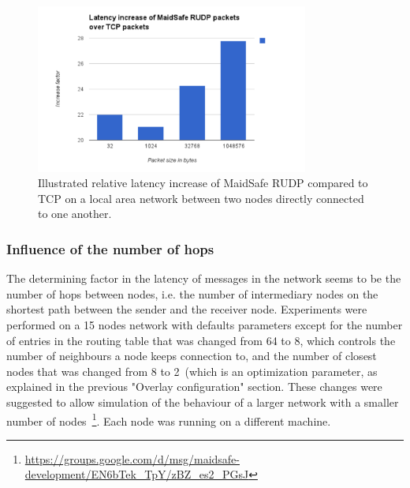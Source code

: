 \begin{figure}[htb]
\begin{center}
\includegraphics[width=0.8\textwidth]{figures/LatencyMaidSafeVsTCP}
\caption[Relative latency increase of MaidSafe RUDP compared to TCP]{\label{fig:LatencyMaidSafeVsTCP} 
Illustrated relative latency increase of MaidSafe RUDP compared to TCP on a local area network between two nodes directly connected to one another.                                                                                                                                                                                                                                                                                                }
\end{center}
\end{figure}


\subsubsection{Influence of the number of hops}

The determining factor in the latency of messages in the network seems to be the number of hops between nodes, i.e. the number of intermediary nodes on the shortest path between the sender and the receiver node. Experiments were performed on a 15 nodes network with defaults parameters except for the number of entries in the routing table that was changed from 64 to 8, which controls the number of neighbours a node keeps connection to, and the number of closest nodes that was changed from 8 to 2~(which is an optimization parameter, as explained in the previous "Overlay configuration" section. These changes were suggested to allow simulation of the behaviour of a larger network with a smaller number of nodes~\footnote{\url{https://groups.google.com/d/msg/maidsafe-development/EN6bTek_TpY/zBZ_es2_PGsJ}}. Each node was running on a different machine.

